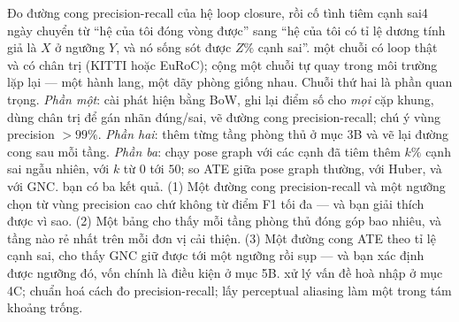 \documentclass[../../vslam.tex]{subfiles}
\begin{document}
\begin{ungdung}
\end{ungdung}

\begin{duan}{Đo đường cong precision-recall của hệ loop closure, rồi cố tình tiêm cạnh sai}{4 ngày}
\dmt chuyển từ ``hệ của tôi đóng vòng được'' sang ``hệ của tôi có tỉ lệ dương tính giả là \(X\) ở ngưỡng \(Y\), và nó sống sót được \(Z\%\) cạnh sai''.
\ddl một chuỗi có loop thật và có chân trị (KITTI hoặc EuRoC); cộng một chuỗi tự quay trong môi trường lặp lại --- một hành lang, một dãy phòng giống nhau. Chuỗi thứ hai là phần quan trọng.
\dbc \emph{Phần một}: cài phát hiện bằng BoW, ghi lại điểm số cho \emph{mọi} cặp khung, dùng chân trị để gán nhãn đúng/sai, vẽ đường cong precision-recall; chú ý vùng precision \(> 99\%\). \emph{Phần hai}: thêm từng tầng phòng thủ ở mục 3B và vẽ lại đường cong sau mỗi tầng. \emph{Phần ba}: chạy pose graph với các cạnh đã tiêm thêm \(k\%\) cạnh sai ngẫu nhiên, với \(k\) từ \(0\) tới \(50\); so ATE giữa pose graph thường, với Huber, và với GNC.
\dxk bạn có ba kết quả. (1) Một đường cong precision-recall và một ngưỡng chọn từ vùng precision cao chứ không từ điểm F1 tối đa --- và bạn giải thích được vì sao. (2) Một bảng cho thấy mỗi tầng phòng thủ đóng góp bao nhiêu, và tầng nào rẻ nhất trên mỗi đơn vị cải thiện. (3) Một đường cong ATE theo tỉ lệ cạnh sai, cho thấy GNC giữ được tới một ngưỡng rồi sụp --- và bạn xác định được ngưỡng đó, vốn chính là điều kiện ở mục 5B.
\dnv {} xử lý vấn đề hoà nhập ở mục 4C;  chuẩn hoá cách đo precision-recall;  lấy perceptual aliasing làm một trong tám khoảng trống.
\end{duan}
\end{document}
